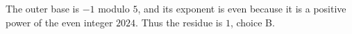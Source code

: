 The outer base is $-1$ modulo $5$, and its exponent is even because it is a positive power of the even integer $2024$. Thus the residue is $\boxed1$, choice B.
